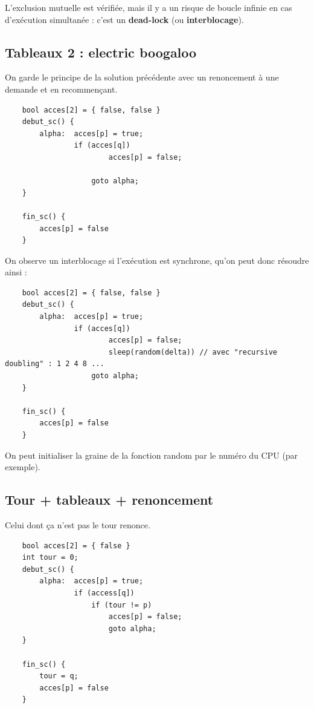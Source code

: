 \documentclass[11pt]{article}
\begin{document}
L'exclusion mutuelle est vérifiée, mais il y a un risque de boucle infinie en cas d'exécution simultanée : c'est un \textbf{dead-lock} (ou \textbf{interblocage}). 

\subsection{Tableaux 2 : electric boogaloo}

On garde le principe de la solution précédente avec un renoncement à une demande et en recommençant.

\begin{verbatim}    
    bool acces[2] = { false, false }
    debut_sc() {
        alpha:  acces[p] = true;
                if (acces[q])
                        acces[p] = false;
                            
                    goto alpha;
    }

    fin_sc() {
        acces[p] = false
    }
\end{verbatim}

On observe un interblocage si l'exécution est synchrone, qu'on peut donc résoudre ainsi :

\begin{verbatim}    
    bool acces[2] = { false, false }
    debut_sc() {
        alpha:  acces[p] = true;
                if (acces[q])
                        acces[p] = false;
                        sleep(random(delta)) // avec "recursive doubling" : 1 2 4 8 ...
                    goto alpha;
    }

    fin_sc() {
        acces[p] = false
    }
\end{verbatim}

On peut initialiser la graine de la fonction random par le numéro du CPU (par exemple).

\subsection{Tour + tableaux + renoncement}
Celui dont ça n'est pas le tour renonce.

\begin{verbatim}    
    bool acces[2] = { false }
    int tour = 0;
    debut_sc() {
        alpha:  acces[p] = true;
                if (access[q])
                    if (tour != p)
                        acces[p] = false;
                        goto alpha;
    }

    fin_sc() {
        tour = q;
        acces[p] = false
    }
\end{verbatim}
\end{document}

